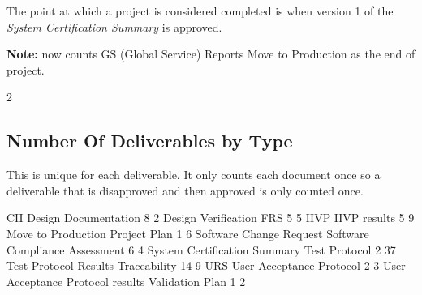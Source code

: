 \documentclass{article}
\begin{document}
The point at which a project is considered completed is when version 1 of the
\textit{System Certification Summary} is approved.

\textbf{Note:} now counts GS (Global Service) Reports Move to Production as the end
of project.

\begin{Schunk}
\begin{Soutput}
[1] 2
\end{Soutput}
\end{Schunk}


\subsection{Number Of Deliverables by Type}
This is unique for each deliverable. It only counts each document once so a deliverable
that is disapproved and then approved is only counted once.

\begin{Schunk}
\begin{Soutput}
                             CII             Design Documentation 
                               8                                2 
             Design Verification                              FRS 
                               5                                5 
                            IIVP                     IIVP results 
                               5                                9 
              Move to Production                     Project Plan 
                               1                                6 
         Software Change Request   Software Compliance Assessment 
                               6                                4 
    System Certification Summary                    Test Protocol 
                               2                               37 
           Test Protocol Results                     Traceability 
                              14                                9 
                             URS         User Acceptance Protocol 
                               2                                3 
User Acceptance Protocol results                  Validation Plan 
                               1                                2 
\end{Soutput}
\end{Schunk}
\end{document}

